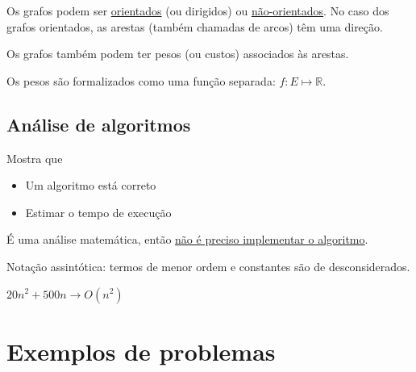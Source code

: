 Os grafos podem ser \underline{orientados} (ou dirigidos) ou \underline{não-orientados}. No caso dos grafos orientados, as arestas (também chamadas de arcos) têm uma direção.

Os grafos também podem ter pesos (ou custos) associados às arestas.

\begin{example}
    \begin{center}
    \end{center}
\end{example}

Os pesos são formalizados como uma função separada: $f: E \mapsto \mathbb{R}$.

\subsection{Análise de algoritmos}

Mostra que

\begin{itemize}
    \item Um algoritmo está correto
    \item Estimar o tempo de execução
\end{itemize}

É uma análise matemática, então \underline{não é preciso implementar o algoritmo}.

Notação assintótica: termos de menor ordem e constantes são de desconsiderados.

$20n^2 + 500n \rightarrow O(n^2)$

\section{Exemplos de problemas}


